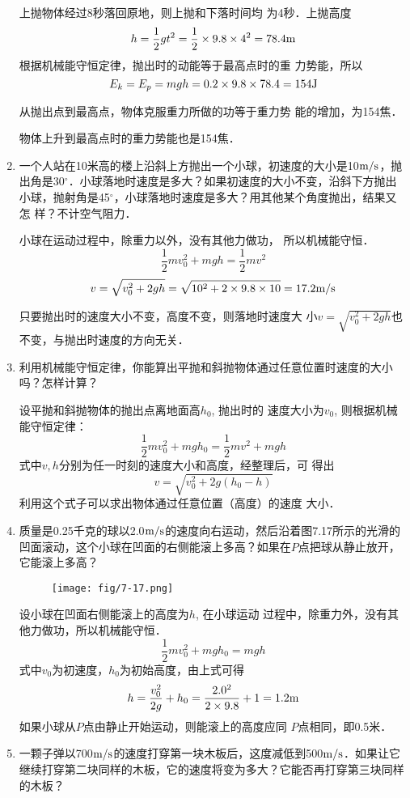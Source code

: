 \begin{enumerate}
\begin{solution}
上抛物体经过8秒落回原地，则上抛和下落时间均
为4秒．上抛高度
\[h=\frac{1}{2}gt^2=\frac{1}{2}\times 9.8\times 4^2=78.4{\rm m}\]
根据机械能守恒定律，抛出时的动能等于最高点时的重
力势能，所以
\[E_k=E_p=mgh=0.2\times9.8\times78.4=154{\rm J}\]

从抛出点到最高点，物体克服重力所做的功等于重力势
能的增加，为154焦．

物体上升到最高点时的重力势能也是154焦．
\end{solution}
\item 一个人站在10米高的楼上沿斜上方抛出一个小球，初速度的大小是10$\text{m}/\text{s}$，抛出角是30$^\circ$．小球落地时速度是多大？如果初速度的大小不变，沿斜下方抛出小球，抛射角是45$^\circ$，小球落地时速度是多大？用其他某个角度抛出，结果又怎
样？不计空气阻力．

\begin{solution}
小球在运动过程中，除重力以外，没有其他力做功，
所以机械能守恒．
\[\frac{1}{2}mv_0^2+mgh=\frac{1}{2}mv^2\]
\[v=\sqrt{v^2_0+2gh}=\sqrt{10^2+2\times9.8\times10}=17.2\text{m}/\text{s}\]

只要抛出时的速度大小不变，高度不变，则落地时速度大
小$v=\sqrt{v^2_0+2gh}$也不变，与抛出时速度的方向无关．
\end{solution}
\item 利用机械能守恒定律，你能算出平抛和斜抛物体通过任意位置时速度的大小吗？怎样计算？

\begin{solution}
设平抛和斜抛物体的抛出点离地面高$h_0$, 抛出时的
速度大小为$v_0$, 则根据机械能守恒定律：
\[\frac{1}{2}mv_0^2+mgh_0=\frac{1}{2}mv^2+mgh\]
式中$v,h$分别为任一时刻的速度大小和高度，经整理后，可
得出
\[v=\sqrt{v^2_0+2g(h_0-h)}\]
利用这个式子可以求出物体通过任意位置（高度）的速度
大小．
\end{solution}
\item 质量是0.25千克的球以2.0$\text{m}/\text{s}$的速度向右运动，然后沿着图7.17所示的光滑的凹面滚动，这个小球在凹面的右侧能滚上多高？如果在$P$点把球从静止放开，它能滚上多高？
\begin{figure}[htp]\centering
\texttt{[image: fig/7-17.png]}
\caption{}
\end{figure}

\begin{solution}
设小球在凹面右侧能滚上的高度为$h$, 在小球运动
过程中，除重力外，没有其他力做功，所以机械能守恒．
\[\frac{1}{2}mv^2_0+mgh_0=mgh\]
式中$v_0$为初速度，$h_0$为初始高度，由上式可得
\[h=\frac{v^2_0}{2g}+h_0=\frac{2.0^2}{2\times 9.8}+1=1.2{\rm m}\]
如果小球从$P$点由静止开始运动，则能滚上的高度应同
$P$点相同，即0.5米．
\end{solution}
\item  一颗子弹以700$\text{m}/\text{s}$的速度打穿第一块木板后，这度减低到500$\text{m}/\text{s}$．如果让它继续打穿第二块同样的木板，它的速度将变为多大？它能否再打穿第三块同样的木板？


\end{enumerate}
